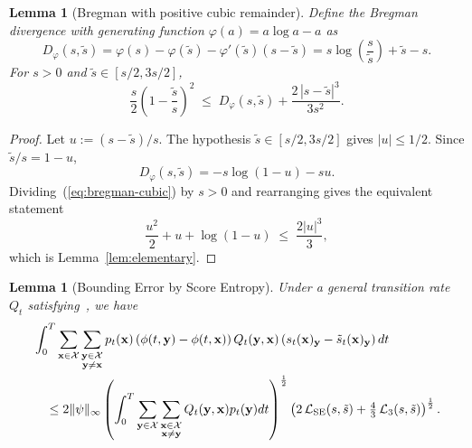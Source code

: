 \documentclass{article} %
\newtheorem{lemma}[theorem]{Lemma}
\def\eqref#1{equation~\ref{#1}}
\newcommand{\bfx}{{\bf x}}
\newcommand{\bfy}{ {\bf y}}
\newcommand{\LSE}{\mathcal{L}_{\mathrm{SE}}}
\renewcommand{\eqref}[1]{\textup{(\ref{#1})}}
\newcommand{\LThree}{\mathcal{L}_{3}}
\begin{document}
\begin{lemma}[Bregman with positive cubic remainder]
\label{lem:bregman-cubic}
Define the Bregman divergence with generating function
$\varphi(a) = a\log a - a$ as
\begin{equation}
D_\varphi(s, \tilde s) = \varphi(s) - \varphi(\tilde s) - \varphi'(\tilde s)(s - \tilde s) = s\log\left(\frac{s}{\tilde s}\right) + \tilde s - s.
\label{eq:bregman}
\end{equation}
For $s > 0$ and $\tilde s \in [s/2, 3s/2]$,
\begin{equation}
\frac{s}{2} {\left(1 - \frac{\tilde s}{s}\right)^2}\;\le\; D_\varphi(s, \tilde s) + \frac{2\,|s - \tilde s|^3}{3 s^2}.
\label{eq:bregman-cubic}
\end{equation}
\end{lemma}

\begin{proof}
Let $u := (s - \tilde s)/s$. The hypothesis $\tilde s \in [s/2, 3s/2]$
gives $|u| \le 1/2$. Since $\tilde s/s = 1 - u$,
\begin{equation*}
D_\varphi(s, \tilde s) = -s\log(1-u) - s u.
\end{equation*}
Dividing~\eqref{eq:bregman-cubic} by $s > 0$ and rearranging gives the
equivalent statement
\begin{equation*}
\frac{u^2}{2} + u + \log(1 - u) \;\le\; \frac{2|u|^3}{3},
\end{equation*}
which is Lemma~\ref{lem:elementary}.
\end{proof}

\begin{lemma}[Bounding Error by Score Entropy]\label{lemma:error_bound_LSE}
    Under a general transition rate $Q_t$ satisfying~, we have 
    \begin{align*}
        &\int_0^T \sum_{\substack{\bfx\in\mathcal{X}}} \sum_{\substack{\bfy\in\mathcal{X} \\ \bfy\neq \bfx}} p_t(\bfx) \left(\phi(t, \bfy)-\phi(t, \bfx) \right) Q_t(\bfy, \bfx) \left( s_t(\bfx)_\bfy - \tilde{s}_t(\bfx)_\bfy \right)  dt \\
        &\quad \leq 2 \| \psi\|_\infty  \left( \int_0^T \sum_{\substack{\bfy \in\mathcal{X}}} \sum_{\substack{\bfx \in\mathcal{X} \\ \bfx \neq \bfy}}  Q_t(\bfy, \bfx) p_t(\bfy)    dt \right)^{\frac{1}{2}} \left( 2\,\LSE(s, \tilde{s}) + \tfrac{4}{3}\,\LThree(s, \tilde{s}) \right)^{\frac{1}{2}}.
    \end{align*}
\end{lemma}
\end{document}
